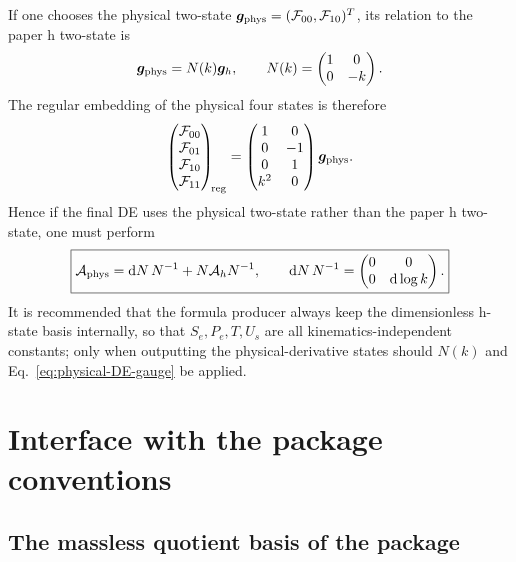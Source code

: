 \documentclass[11pt,a4paper]{article}
\newcommand{\dd}{\mathrm d}
\begin{document}
If one chooses the physical two-state $\bm g_{\rm phys}=(\mathcal F_{00},\mathcal F_{10})^T$, its relation to the paper h two-state is
\begin{equation}
 \bm g_{\rm phys}=N(k)\bm g_h,
 \qquad
 N(k)=\begin{pmatrix}1&0\\0&-k\end{pmatrix}.
 \label{eq:physical-basis-N}
\end{equation}
The regular embedding of the physical four states is therefore
\begin{equation}
 \begin{pmatrix}
 \mathcal F_{00}\\\mathcal F_{01}\\\mathcal F_{10}\\\mathcal F_{11}
 \end{pmatrix}_{\!\rm reg}
 =
 \begin{pmatrix}
 1&0\\
 0&-1\\
 0&1\\
 k^2&0
 \end{pmatrix}
 \bm g_{\rm phys}.
 \label{eq:physical-four-to-two}
\end{equation}
Hence if the final DE uses the physical two-state rather than the paper h two-state, one must perform
\begin{equation}
 \boxed{
 \mathcal A_{\rm phys}
 =\dd N\,N^{-1}+N\mathcal A_hN^{-1},
 \qquad
 \dd N\,N^{-1}
 =\begin{pmatrix}0&0\\0&\dd\log k\end{pmatrix}.
 }
 \label{eq:physical-DE-gauge}
\end{equation}
It is recommended that the formula producer always keep the dimensionless h-state basis internally, so that $S_e,P_e,T,U_s$ are all kinematics-independent constants; only when outputting the physical-derivative states should $N(k)$ and Eq.~\eqref{eq:physical-DE-gauge} be applied.

\section{Interface with the package conventions}
\label{sec:package-adapter}

\subsection{The massless quotient basis of the package}
\end{document}
